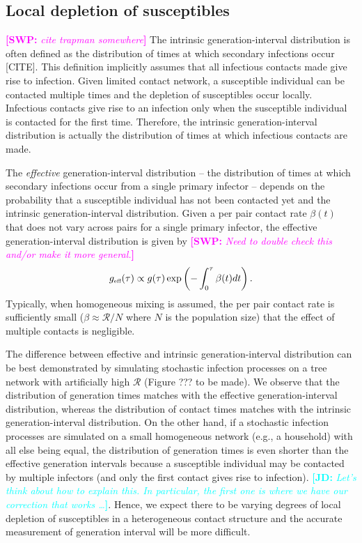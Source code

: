 \documentclass{article}
\newcommand{\RR}{\ensuremath{{\mathcal R}}}
\newcommand{\tsub}[2]{#1_{{\textrm{\tiny #2}}}}
\newcommand{\comment}[3]{\textcolor{#1}{\textbf{[#2: }\textsl{#3}\textbf{]}}}
\newcommand{\jd}[1]{\comment{cyan}{JD}{#1}}
\newcommand{\swp}[1]{\comment{magenta}{SWP}{#1}}
\begin{document}
\subsection{Local depletion of susceptibles}

\swp{cite trapman somewhere}
The intrinsic generation-interval distribution is often defined as the distribution of times at which secondary infections occur [CITE].
This definition implicitly assumes that all infectious contacts made give rise to infection. 
Given limited contact network, a susceptible individual can be contacted multiple times and the depletion of susceptibles occur locally.
Infectious contacts give rise to an infection only when the susceptible individual is contacted for the first time.
Therefore, the intrinsic generation-interval distribution is actually the distribution of times at which infectious contacts are made.

The \emph{effective} generation-interval distribution -- the distribution of times at which secondary infections occur from a single primary infector -- depends on the probability that a susceptible individual has not been contacted yet and the intrinsic generation-interval distribution.
Given a per pair contact rate $\beta(t)$ that does not vary across pairs for a single primary infector, the effective generation-interval distribution is given by \swp{Need to double check this and/or make it more general.}
\begin{equation}
\tsub{g}{eff}(\tau) \propto g(\tau) \exp\left(-\int_0^{\tau} \beta(t) dt\right).
\end{equation}
Typically, when homogeneous mixing is assumed,
the per pair contact rate is sufficiently small ($\beta \approx \RR/N$ where $N$ is the population size) that the effect of multiple contacts is negligible.

The difference between effective and intrinsic generation-interval distribution can be best demonstrated by simulating stochastic infection processes on a tree network with artificially high $\RR$ (Figure ??? to be made).
We observe that the distribution of generation times matches with the effective generation-interval distribution, whereas the distribution of contact times matches with the intrinsic generation-interval distribution.
On the other hand, if a stochastic infection processes are simulated on a small homogeneous network (e.g., a household) with all else being equal, the distribution of generation times is even shorter than the effective generation intervals because a susceptible individual may be contacted by multiple infectors (and only the first contact gives rise to infection).
\jd{Let's think about how to explain this. In particular, the first one is where we have our correction that works \ldots}.
Hence, we expect there to be varying degrees of local depletion of susceptibles in a heterogeneous contact structure and the accurate measurement of generation interval will be more difficult.
\end{document}
